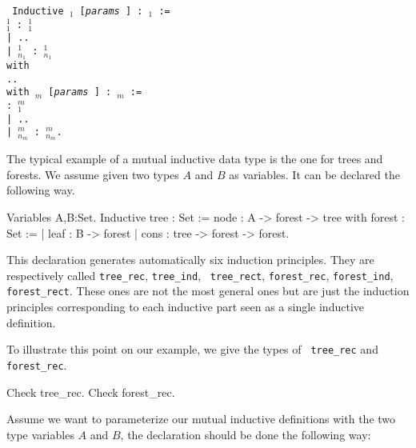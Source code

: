 \medskip
{\tt 
Inductive {{\ident$_1$} [{\rm\sl params} ] : {\type$_1$} :=  \\
\mbox{}\hspace{0.4cm}  {\ident$_1^1$} : {\type$_1^1$} \\
\mbox{}\hspace{0.1cm}| ..  \\
\mbox{}\hspace{0.1cm}| {\ident$_{n_1}^1$} : {\type$_{n_1}^1$}  \\
with\\
\mbox{}\hspace{0.1cm} .. \\
with {\ident$_m$} [{\rm\sl params} ] : {\type$_m$} := \\
\mbox{}\hspace{0.4cm}{\ident$_1^m$} : {\type$_1^m$} \\
\mbox{}\hspace{0.1cm}| .. \\
\mbox{}\hspace{0.1cm}| {\ident$_{n_m}^m$} : {\type$_{n_m}^m$}.
}}
\medskip

\Example
The typical example of a mutual inductive data type is the one for
trees and forests. We assume given two types $A$ and $B$ as variables.
It can be declared the following way.

\begin{coq_example*}
Variables A,B:Set.
Inductive tree : Set :=  node : A -> forest -> tree
with forest : Set := 
   | leaf : B -> forest 
   | cons : tree -> forest -> forest.
\end{coq_example*}

This declaration generates automatically six induction
principles. They are respectively 
called {\tt tree\_rec}, {\tt tree\_ind}, {\tt
  tree\_rect}, {\tt forest\_rec}, {\tt forest\_ind}, {\tt
  forest\_rect}.  These ones are not the most general ones but are
just the induction principles corresponding to each inductive part
seen as a single inductive definition.

To illustrate this point on our example, we give the types of {\tt
  tree\_rec} and {\tt forest\_rec}.

\begin{coq_example}
Check tree_rec.
Check forest_rec.
\end{coq_example}

Assume we want to parameterize our mutual inductive definitions with
the two type variables $A$ and $B$, the declaration should be done the
following way:

